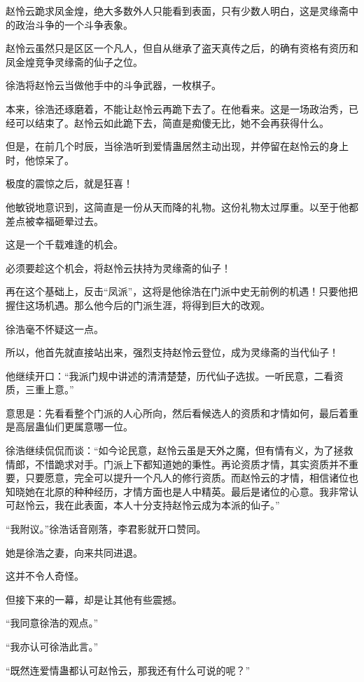 \begin{this_body}
赵怜云跪求凤金煌，绝大多数外人只能看到表面，只有少数人明白，这是灵缘斋中的政治斗争的一个斗争表象。

赵怜云虽然只是区区一个凡人，但自从继承了盗天真传之后，的确有资格有资历和凤金煌竞争灵缘斋的仙子之位。

徐浩将赵怜云当做他手中的斗争武器，一枚棋子。

本来，徐浩还琢磨着，不能让赵怜云再跪下去了。在他看来。这是一场政治秀，已经可以结束了。赵怜云如此跪下去，简直是痴傻无比，她不会再获得什么。

但是，在前几个时辰，当徐浩听到爱情蛊居然主动出现，并停留在赵怜云的身上时，他惊呆了。

极度的震惊之后，就是狂喜！

他敏锐地意识到，这简直是一份从天而降的礼物。这份礼物太过厚重。以至于他都差点被幸福砸晕过去。

这是一个千载难逢的机会。

必须要趁这个机会，将赵怜云扶持为灵缘斋的仙子！

再在这个基础上，反击“凤派”，这将是他徐浩在门派中史无前例的机遇！只要他把握住这场机遇。那么他今后的门派生涯，将得到巨大的改观。

徐浩毫不怀疑这一点。

所以，他首先就直接站出来，强烈支持赵怜云登位，成为灵缘斋的当代仙子！

他继续开口：“我派门规中讲述的清清楚楚，历代仙子选拔。一听民意，二看资质，三重上意。”

意思是：先看看整个门派的人心所向，然后看候选人的资质和才情如何，最后着重是高层蛊仙们更属意哪一位。

徐浩继续侃侃而谈：“如今论民意，赵怜云虽是天外之魔，但有情有义，为了拯救情郎，不惜跪求对手。门派上下都知道她的秉性。再论资质才情，其实资质并不重要，只要愿意，完全可以提升一个凡人的修行资质。而赵怜云的才情，相信诸位也知晓她在北原的种种经历，才情方面也是人中精英。最后是诸位的心意。我非常认可赵怜云，我在此表面，本人十分支持赵怜云成为本派的仙子。”

“我附议。”徐浩话音刚落，李君影就开口赞同。

她是徐浩之妻，向来共同进退。

这并不令人奇怪。

但接下来的一幕，却是让其他有些震撼。

“我同意徐浩的观点。”

“我亦认可徐浩此言。”

“既然连爱情蛊都认可赵怜云，那我还有什么可说的呢？”


\end{this_body}
